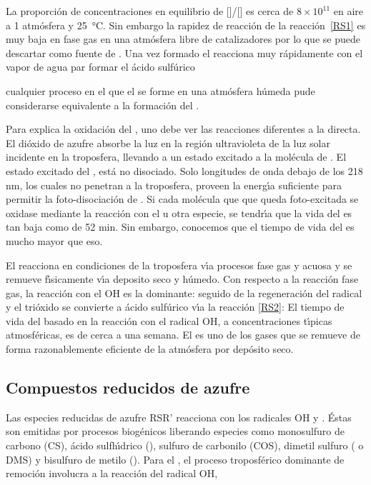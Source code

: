 La proporci\'on de concentraciones en equilibrio de []/[]   es cerca de $8\times10^{11}$ en aire a 1 atm\'osfera y \SI{25}{\celsius}. Sin embargo la rapidez de reacci\'on de la reacci\'on~\ref{RS1}  es muy baja en fase gas en una atm\'osfera libre de catalizadores por lo que se puede descartar como fuente de . Una vez formado el   reacciona muy r\'apidamente con el vapor de agua par formar el \'acido sulf\'urico 

cualquier proceso en el que el  se forme en una atm\'osfera h\'umeda pude considerarse equivalente a la formaci\'on del .

Para explica la oxidaci\'on del , uno debe ver las reacciones diferentes a la directa. El di\'oxido de azufre absorbe la luz en la regi\'on ultravioleta de  la luz solar incidente en la troposfera, llevando a un estado excitado a la mol\'ecula de .
El estado excitado del , est\'a no disociado. Solo longitudes de onda debajo de los 218 nm, los cuales no penetran a la troposfera, proveen la energ\'{\i}a suficiente para permitir la foto-disociaci\'on de . Si cada mol\'ecula que  que queda foto-excitada se oxidase mediante la reacci\'on con el  u otra especie, se tendr\'{\i}a que la vida del  es tan baja como de 52 min. Sin embargo, conocemos que el tiempo de vida del  es mucho mayor que eso.

El   reacciona en condiciones de la troposfera v\'{\i}a procesos fase gas y acuosa y se remueve f\'{\i}sicamente v\'{\i}a deposito seco y h\'umedo. Con respecto a la reacci\'on fase gas, la reacci\'on con el OH es la dominante:
seguido de la regeneraci\'on del radical 
y el tri\'oxido se convierte a \'acido sulf\'urico v\'{\i}a la reacci\'on \ref{RS2}:
El tiempo de vida del  basado en la reacci\'on con el radical OH, a concentraciones t\'{\i}picas atmosf\'ericas, es de cerca a una semana. El  es uno de los gases que se remueve de forma razonablemente eficiente de la atm\'osfera por dep\'osito seco.

\subsection{Compuestos reducidos de azufre}\label{crso2}
Las especies reducidas de azufre  RSR' reacciona con los radicales OH y . \'Estas son emitidas por procesos biog\'enicos liberando especies como monosulfuro de carbono (CS), \'acido sulfh\'{\i}drico (), sulfuro de carbonilo (\gls{COS}), dimetil sulfuro ( o \gls{DMS}) y bisulfuro de metilo (). Para el , el proceso troposf\'erico dominante de remoci\'on involucra a la reacci\'on del radical OH,

